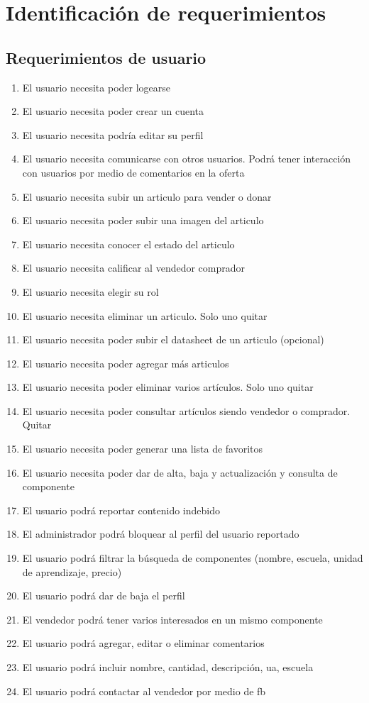 \section{Identificación de requerimientos}	


\subsection{Requerimientos de usuario}

\begin{enumerate}
	\item El usuario necesita poder logearse
	\item El usuario necesita poder crear un cuenta 
	\item El usuario necesita podría editar su perfil
	\item El usuario necesita comunicarse con otros usuarios. Podrá tener interacción con usuarios por medio de comentarios en la oferta
	\item El usuario necesita subir un articulo para vender o donar 
	\item El usuario necesita poder subir una imagen del articulo
	\item El usuario necesita conocer el estado del articulo
	\item El usuario necesita calificar al vendedor comprador
	\item El usuario necesita elegir su rol
	\item El usuario necesita eliminar un articulo. Solo uno quitar
	\item El usuario necesita poder subir el datasheet de un articulo (opcional)
	\item El usuario necesita poder agregar más articulos
	\item El usuario necesita poder eliminar varios artículos. Solo uno quitar
	\item El usuario necesita poder consultar artículos siendo vendedor o comprador. Quitar
	\item El usuario necesita poder generar una lista de favoritos
	\item El usuario necesita poder dar de alta, baja y actualización y consulta de componente 
	\item El usuario podrá reportar contenido indebido
	\item El administrador podrá bloquear al perfil del usuario reportado
	\item El usuario podrá filtrar la búsqueda de componentes (nombre, escuela, unidad de aprendizaje, precio)
	\item El usuario podrá dar de baja el perfil
	\item El vendedor podrá tener varios interesados en un mismo componente
	\item El usuario podrá agregar, editar o eliminar comentarios
	\item El usuario podrá incluir nombre, cantidad, descripción, ua, escuela
	\item El usuario podrá contactar al vendedor por medio de fb
\end{enumerate}


